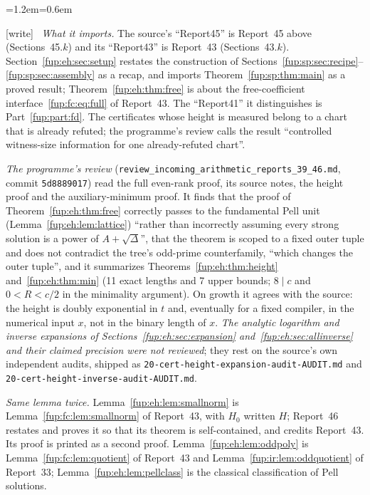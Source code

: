 \documentclass[11pt,letterpaper]{article}
\theoremstyle{definition}\newtheorem{definition}[theorem]{Definition}
\theoremstyle{remark}\newtheorem{remark}[theorem]{Remark}
\newcommand{\wtag}{\textup{[write]}}
\newenvironment{writenote}{\par\smallskip\begin{list}{}{\leftmargin=1.2em\rightmargin=0.6em}\item[]\small\wtag\ }{\end{list}\smallskip}
\newcommand{\rw}[1]{\nolinkurl{#1}}%
\begin{document}
\begin{writenote}
\emph{What it imports.} The source's ``Report45'' is Report~45 above (Sections~45.$k$) and its ``Report43'' is Report~43 (Sections~43.$k$). Section~\ref{fup:eh:sec:setup} restates the construction of Sections~\ref{fup:sp:sec:recipe}--\ref{fup:sp:sec:assembly} as a recap, and imports Theorem~\ref{fup:sp:thm:main} as a proved result; Theorem~\ref{fup:eh:thm:free} is about the free-coefficient interface~\eqref{fup:fc:eq:full} of Report~43. The ``Report41'' it distinguishes is Part~\ref{fup:part:fd}. The certificates whose height is measured belong to a chart that is already refuted; the programme's review calls the result ``controlled witness-size information for one already-refuted chart''.

\emph{The programme's review} (\rw{review_incoming_arithmetic_reports_39_46.md}, commit \texttt{5d8889017}) read the full even-rank proof, its source notes, the height proof and the auxiliary-minimum proof. It finds that the proof of Theorem~\ref{fup:eh:thm:free} correctly passes to the fundamental Pell unit (Lemma~\ref{fup:eh:lem:lattice}) ``rather than incorrectly assuming every strong solution is a power of $A+\sqrt\Delta$'', that the theorem is scoped to a fixed outer tuple and does not contradict the tree's odd-prime counterfamily, ``which changes the outer tuple'', and it summarizes Theorems~\ref{fup:eh:thm:height} and~\ref{fup:eh:thm:min} (11 exact lengths and 7 upper bounds; $8\mid c$ and $0<R<c/2$ in the minimality argument). On growth it agrees with the source: the height is doubly exponential in $t$ and, eventually for a fixed compiler, in the numerical input $x$, not in the binary length of $x$. \emph{The analytic logarithm and inverse expansions of Sections~\ref{fup:eh:sec:expansion} and~\ref{fup:eh:sec:allinverse} and their claimed precision were not reviewed}; they rest on the source's own independent audits, shipped as \rw{20-cert-height-expansion-audit-AUDIT.md} and \rw{20-cert-height-inverse-audit-AUDIT.md}.

\emph{Same lemma twice.} Lemma~\ref{fup:eh:lem:smallnorm} is Lemma~\ref{fup:fc:lem:smallnorm} of Report~43, with $H_0$ written $H$; Report~46 restates and proves it so that its theorem is self-contained, and credits Report~43. Its proof is printed as a second proof. Lemma~\ref{fup:eh:lem:oddpoly} is Lemma~\ref{fup:fc:lem:quotient} of Report~43 and Lemma~\ref{fup:ir:lem:oddquotient} of Report~33; Lemma~\ref{fup:eh:lem:pellclass} is the classical classification of Pell solutions.


\end{writenote}
\end{document}
